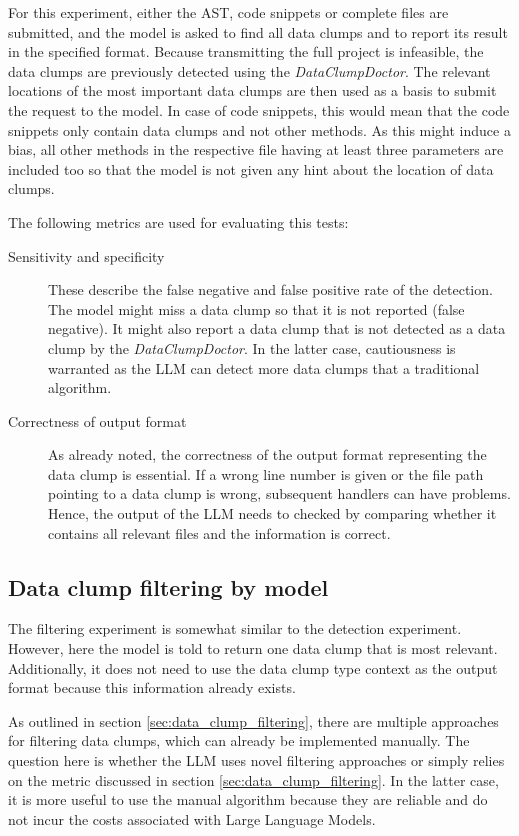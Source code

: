 For this experiment, either the \ac{AST}, code snippets or complete files are submitted, and the model is asked to find all data clumps and to report its result in the specified format.
Because transmitting the full project is infeasible, the data clumps are previously detected using the \textit{DataClumpDoctor}. The relevant locations of the most important data clumps are then used as a basis to submit the request to the model. In case of code snippets, this would mean that the code snippets only contain data clumps and not other methods. As this might induce a bias, all other methods in the respective file having at least three parameters are included too so that the model is not given any hint about the location of data clumps. 


The following metrics are used for evaluating this tests:

\begin{description}
    \item[Sensitivity and specificity] These describe the false negative and false positive rate of the detection. The model might miss a data clump so that it is not reported (false negative). It might also report  a data clump that is not detected as a data clump by the \textit{DataClumpDoctor}. In the latter case, cautiousness is warranted as the \ac{LLM} can detect more data clumps that a traditional algorithm. 

    \item[Correctness of output format]

    As already noted, the correctness of the output format representing the data clump is essential. If a wrong line number is given or the file path pointing to a data clump is wrong, subsequent handlers can have problems. Hence, the output of the \ac{LLM} needs to checked by comparing whether it contains all relevant files and the information is correct. 
   
\end{description}

\subsection{Data clump filtering by model}
The filtering experiment is somewhat similar to the detection experiment. However, here the model is told to return one data clump that is most relevant. Additionally, it does not need to use the data clump type context as the output format because this information already exists. 

As outlined in section \ref{sec:data_clump_filtering}, there are multiple approaches for filtering data clumps, which can already be implemented manually. 
The question here is whether the \ac{LLM} uses novel filtering approaches or simply relies on the metric discussed in section \ref{sec:data_clump_filtering}. In the latter case, it is more useful to use the manual algorithm because they are reliable and do not incur the costs associated with Large Language Models. 

